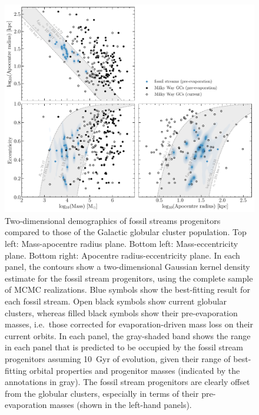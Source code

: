 \documentclass[twocolumn]{aastex63}
\begin{document}
\begin{figure}
\includegraphics[width=\hsize]{figures/distributions_2d_mc.pdf}%
\caption{
\label{fig:kde}
Two-dimensional demographics of fossil streams progenitors compared to those of the Galactic globular cluster population. Top left: Mass-apocentre radius plane. Bottom left: Mass-eccentricity plane. Bottom right: Apocentre radius-eccentricity plane. In each panel, the contours show a two-dimensional Gaussian kernel density estimate for the fossil stream progenitors, using the complete sample of MCMC realizations. Blue symbols show the best-fitting result for each fossil stream. Open black symbols show current globular clusters, whereas filled black symbols show their pre-evaporation masses, i.e.\ those corrected for evaporation-driven mass loss on their current orbits. In each panel, the gray-shaded band shows the range in each panel that is predicted to be occupied by the fossil stream progenitors assuming 10~Gyr of evolution, given their range of best-fitting orbital properties and progenitor masses (indicated by the annotations in gray). The fossil stream progenitors are clearly offset from the globular clusters, especially in terms of their pre-evaporation masses (shown in the left-hand panels).}
\end{figure}
\end{document}
